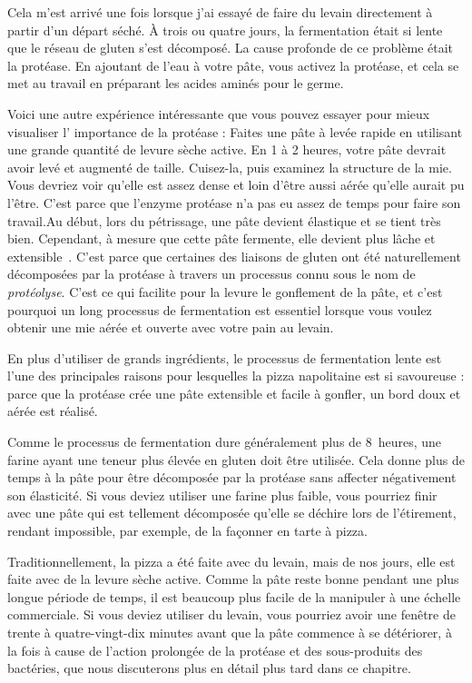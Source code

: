 Cela m'est arrivé une fois lorsque j'ai essayé de faire du levain directement à partir d'un
départ séché. À trois ou quatre jours, la fermentation était si lente que le
réseau de gluten s'est décomposé. La cause profonde de ce problème était la protéase.
En ajoutant de l'eau à votre pâte, vous activez la protéase, et cela se met au travail
en préparant les acides aminés pour le germe.

Voici une autre expérience intéressante que vous pouvez essayer pour mieux visualiser l'
importance de la protéase : Faites une pâte à levée rapide en utilisant une grande quantité
de levure sèche active. En 1 à 2 heures, votre pâte devrait avoir levé et
augmenté de taille. Cuisez-la, puis examinez la structure de la mie. Vous devriez voir
qu'elle est assez dense et loin d'être aussi aérée qu'elle aurait pu l'être. C'est
parce que l'enzyme protéase n'a pas eu assez de temps pour faire son travail.Au début, lors du pétrissage, une pâte devient élastique et se tient très bien. Cependant, à mesure que cette pâte fermente, elle devient plus lâche et extensible~\cite{protease+enzyme+bread}. C'est parce que certaines des liaisons de gluten ont été naturellement décomposées par la protéase à travers un processus connu sous le nom de \emph{protéolyse}. C'est ce qui facilite pour la levure le gonflement de la pâte, et c'est pourquoi un long processus de fermentation est essentiel lorsque vous voulez obtenir une mie aérée et ouverte avec votre pain au levain.

En plus d'utiliser de grands ingrédients, le processus de fermentation lente est l'une des principales raisons pour lesquelles la pizza napolitaine est si savoureuse : parce que la protéase crée une pâte extensible et facile à gonfler, un bord doux et aérée est réalisé.

Comme le processus de fermentation dure généralement plus de 8~heures, une farine ayant une teneur plus élevée en gluten doit être utilisée. Cela donne plus de temps à la pâte pour être décomposée par la protéase sans affecter négativement son élasticité. Si vous deviez utiliser une farine plus faible, vous pourriez finir avec une pâte qui est tellement décomposée qu'elle se déchire lors de l'étirement, rendant impossible, par exemple, de la façonner en tarte à pizza.

Traditionnellement, la pizza a été faite avec du levain, mais de nos jours, elle est faite avec de la levure sèche active. Comme la pâte reste bonne pendant une plus longue période de temps, il est beaucoup plus facile de la manipuler à une échelle commerciale. Si vous deviez utiliser du levain, vous pourriez avoir une fenêtre de trente à quatre-vingt-dix minutes avant que la pâte commence à se détériorer, à la fois à cause de l'action prolongée de la protéase et des sous-produits des bactéries, que nous discuterons plus en détail plus tard dans ce chapitre.

